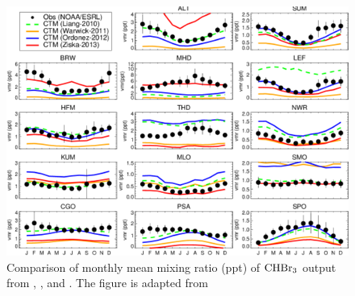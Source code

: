\begin{figure}[h]
    \centering
    \includegraphics[width =0.9\linewidth]{Appendix/images/Hossaini2013_fig5_bromoform.png}
    \caption{Comparison of monthly mean mixing ratio (ppt) of $\mathrm{CHBr_3}$ output from \cite{Liang2010}, \cite{ziska}, \cite{Warwick2006} and \cite{Ordonez2012}. The figure is adapted from \cite{Hossaini2013}}
    \label{fig:Hosaini_fig5}
\end{figure}